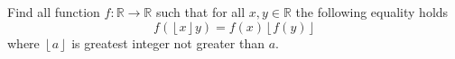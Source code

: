 Find all function $f:\mathbb{R}\rightarrow\mathbb{R}$ such that for all $x,y\in\mathbb{R}$ the following equality holds \[f(\left\lfloor x\right\rfloor y)=f(x)\left\lfloor f(y)\right\rfloor \] where $\left\lfloor a\right\rfloor $ is greatest integer not greater than $a.$
